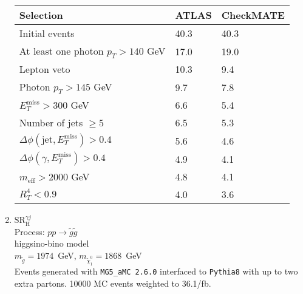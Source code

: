 \documentclass[12pt,fleqn]{article}
\begin{document}
\begin{enumerate}
\begin{table}[h!] 
 \renewcommand*{\arraystretch}{1.2}
 \begin{tabular}{l|p{3cm}|p{3cm}} \toprule
  Selection                                                                       & ATLAS    & CheckMATE       \\ \midrule
  Initial events                                                                  & 40.3     &  40.3          \\
  At least one photon $p_T>140$ GeV                                               & 17.0     &  19.0 \\
  Lepton veto                                                                     & 10.3     &  9.4 \\   
  Photon $p_T>145$ GeV                                                            &  9.7     &  7.8 \\
  $E_T^\mathrm{miss} > 300$ GeV                                                   &  6.6     &  5.4 \\
  Number of jets $\geq 5$                                                         &  6.5     &  5.3 \\
  $\Delta\phi(\mathrm{jet},E_T^\mathrm{miss}) > 0.4$                              &  5.6     &  4.6 \\  
  $\Delta\phi(\gamma,E_T^\mathrm{miss}) > 0.4$                                    &  4.9     &  4.1 \\
  $m_{\mathrm{eff}} > 2000$ GeV                                                   &  4.8     &  4.1 \\
  $R^4_T < 0.9$                                                                   &  4.0     &  3.6 \\ 
 \bottomrule
 \end{tabular}
\end{table} 
 
\item{$\mathrm{SR}^{\gamma j}_{\mathrm{H}}$\\}
 Process: $ p p \to \tilde{g} \tilde{g}$\\
 higgsino-bino model\\
 $m_{\tilde{g}} = 1974$~GeV, $m_{\tilde{\chi}_1^0} = 1868$~GeV\\
 Events generated with \texttt{MG5\_aMC 2.6.0} interfaced to \texttt{Pythia8} with up to two extra partons.
 10000 MC events weighted to 36.1/fb.


\end{enumerate}
\end{document}
